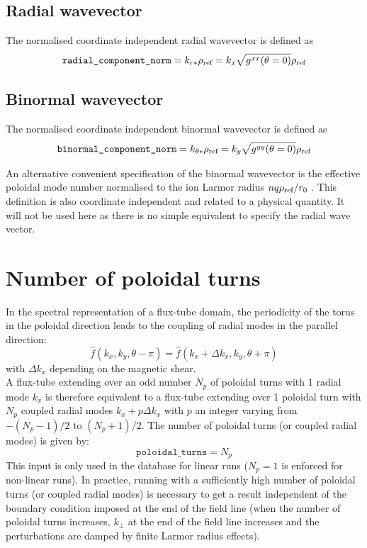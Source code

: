 \documentclass[a4paper]{report}
\begin{document}
\subsection{Radial wavevector} \label{sec:kx}
The normalised coordinate independent radial wavevector is defined as
\begin{equation}
 \texttt{radial\_component\_norm}=k_{r*}\rho_{\textrm{ref}} = k_x \sqrt{g^{xx}(\theta=0)} \rho_{\textrm{ref}}
\end{equation}

\subsection{Binormal wavevector} \label{sec:ky}
The normalised coordinate independent binormal wavevector is defined as
\begin{equation}
 \texttt{binormal\_component\_norm}=k_{\theta*}\rho_{\textrm{ref}} = k_y \sqrt{g^{yy}(\theta=0)} \rho_{\textrm{ref}}
\end{equation}

An alternative convenient specification of the binormal wavevector is the effective poloidal mode number normalised to the ion Larmor radius  $nq\rho_{\textrm{ref}}/r_0$  \cite{Merlo:PoP2016}. This definition is also coordinate independent and related to a physical quantity. It will not be used here as there is no simple equivalent to specify the radial wave vector.

\section{Number of poloidal turns} \label{sec:polturns}
In the spectral representation of a flux-tube domain, the periodicity of the torus in the poloidal direction leads to the coupling of radial modes in the parallel direction:
$$\hat{f}(k_x,k_y,\theta-\pi)=\hat{f}(k_x+\Delta k_x,k_y,\theta+\pi)$$
with $\Delta k_x$ depending on the magnetic shear.\\
A flux-tube extending over an odd number $N_p$ of poloidal turns with 1 radial mode $k_x$ is therefore equivalent to a flux-tube extending over 1 poloidal turn with $N_p$ coupled radial modes $k_x + p\Delta k_x$ with $p$ an integer varying from $-(N_p-1)/2$ to $(N_p+1)/2$. The number of poloidal turns (or coupled radial modes) is given by:
$$\texttt{poloidal\_turns}=N_p$$
This input is only used in the database for linear runs ($N_p=1$ is enforced for non-linear runs).
In practice, running with a sufficiently high number of poloidal turns (or coupled radial modes) is necessary to get a result independent of the boundary condition imposed at the end of the field line (when the number of poloidal turns increases, $k_\perp$ at the end of the field line increases and the perturbations are damped by finite Larmor radius effects). 
\end{document}
